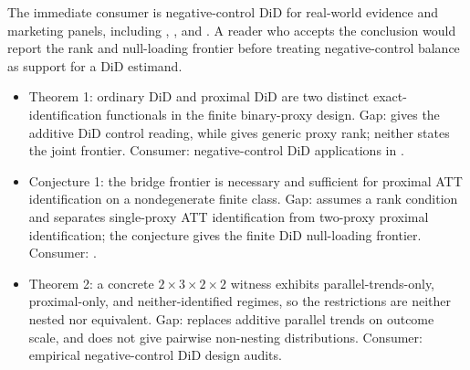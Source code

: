 \documentclass[11pt]{article}
\theoremstyle{definition}
\theoremstyle{plain}
\theoremstyle{remark}
\begin{document}
The immediate consumer is negative-control DiD for real-world evidence and marketing panels, including \citet{PenningDeVriesGroenwold2023NegativeControls}, \citet{Gregori2025DIDNegativeControls}, and \citet{ZhangEtAl2025NCCDiD}.  A reader who accepts the conclusion would report the rank and null-loading frontier before treating negative-control balance as support for a DiD estimand.

\begin{itemize}[leftmargin=*]
\item Theorem 1: ordinary DiD and proximal DiD are two distinct exact-identification functionals in the finite binary-proxy design. Gap: \citet{SoferRichardsonColicinoSchwartzTchetgen2016NOC} gives the additive DiD control reading, while \citet{MiaoGengTchetgen2018ProxyVariables} gives generic proxy rank; neither states the joint frontier. Consumer: negative-control DiD applications in \citet{ZhangEtAl2025NCCDiD}.
\item Conjecture 1: the bridge frontier is necessary and sufficient for proximal ATT identification on a nondegenerate finite class. Gap: \citet[\S3.2, pp. 1157--1160]{MiaoGengTchetgen2018ProxyVariables} assumes a rank condition and \citet[\S2--\S3]{ParkRichardsonTchetgen2024SingleProxy} separates single-proxy ATT identification from two-proxy proximal identification; the conjecture gives the finite DiD null-loading frontier. Consumer: \citet{PenningDeVriesGroenwold2023NegativeControls}.
\item Theorem 2: a concrete \(2\times3\times2\times2\) witness exhibits parallel-trends-only, proximal-only, and neither-identified regimes, so the restrictions are neither nested nor equivalent. Gap: \citet{TchetgenParkRichardson2024UniversalDID} replaces additive parallel trends on outcome scale, and \citet{SoferRichardsonColicinoSchwartzTchetgen2016NOC} does not give pairwise non-nesting distributions. Consumer: empirical negative-control DiD design audits.
\end{itemize}
\end{document}
